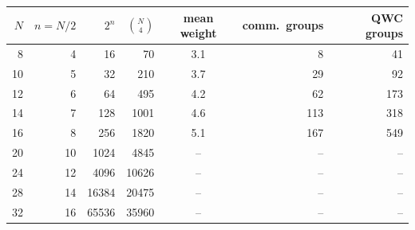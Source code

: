 \begin{tabular}{r r r r c r r}
\toprule
$N$ & $n=N/2$ & $2^n$ & $\binom{N}{4}$ & mean weight & comm.\ groups & QWC groups \\
\midrule
8 & 4 & 16 & 70 & 3.1 & 8 & 41 \\
10 & 5 & 32 & 210 & 3.7 & 29 & 92 \\
12 & 6 & 64 & 495 & 4.2 & 62 & 173 \\
14 & 7 & 128 & 1001 & 4.6 & 113 & 318 \\
16 & 8 & 256 & 1820 & 5.1 & 167 & 549 \\
20 & 10 & 1024 & 4845 & -- & -- & -- \\
24 & 12 & 4096 & 10626 & -- & -- & -- \\
28 & 14 & 16384 & 20475 & -- & -- & -- \\
32 & 16 & 65536 & 35960 & -- & -- & -- \\
\bottomrule
\end{tabular}
